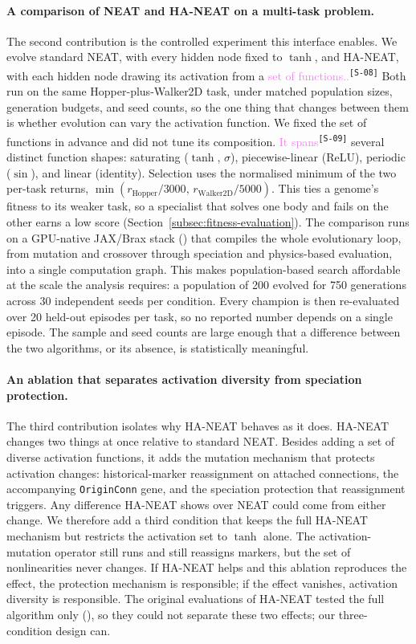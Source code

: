 \documentclass[12pt]{article}
\newcommand{\revID}[1]{\textsuperscript{\scriptsize\texttt{[#1]}}}
\newcommand{\revStyle}[2]{\textcolor{violet}{#2}\revID{#1}}   %
\begin{document}
\paragraph{A comparison of NEAT and HA-NEAT on a multi-task problem.}
The second contribution is the controlled experiment this interface enables.
We evolve standard NEAT, with every hidden node fixed to $\tanh$, and HA-NEAT, with each hidden node drawing its activation from a \revStyle{S-08}{set of functions..}
Both run on the same Hopper-plus-Walker2D task, under matched population sizes, generation budgets, and seed counts, so the one thing that changes between them is whether evolution can vary the activation function.
We fixed the set of functions in advance and did not tune its composition.
\revStyle{S-09}{It spans} several distinct function shapes: saturating ($\tanh$, $\sigma$), piecewise-linear (ReLU), periodic ($\sin$), and linear (identity).
Selection uses the normalised minimum of the two per-task returns, $\min(r_{\text{Hopper}}/3000,\, r_{\text{Walker2D}}/5000)$.
This ties a genome's fitness to its weaker task, so a specialist that solves one body and fails on the other earns a low score (Section~\ref{subsec:fitness-evaluation}).
The comparison runs on a GPU-native JAX/Brax stack (\cite{freeman_brax_2021,wang_tensorized_2024}) that compiles the whole evolutionary loop, from mutation and crossover through speciation and physics-based evaluation, into a single computation graph.
This makes population-based search affordable at the scale the analysis requires: a population of 200 evolved for 750 generations across 30 independent seeds per condition.
Every champion is then re-evaluated over 20 held-out episodes per task, so no reported number depends on a single episode.
The sample and seed counts are large enough that a difference between the two algorithms, or its absence, is statistically meaningful.

\paragraph{An ablation that separates activation diversity from speciation protection.}
The third contribution isolates why HA-NEAT behaves as it does.
HA-NEAT changes two things at once relative to standard NEAT.
Besides adding a set of diverse activation functions, it adds the mutation mechanism that protects activation changes: historical-marker reassignment on attached connections, the accompanying \texttt{OriginConn} gene, and the speciation protection that reassignment triggers.
Any difference HA-NEAT shows over NEAT could come from either change.
We therefore add a third condition that keeps the full HA-NEAT mechanism but restricts the activation set to $\tanh$ alone.
The activation-mutation operator still runs and still reassigns markers, but the set of nonlinearities never changes.
If HA-NEAT helps and this ablation reproduces the effect, the protection mechanism is responsible; if the effect vanishes, activation diversity is responsible.
The original evaluations of HA-NEAT tested the full algorithm only (\cite{hagg_evolving_2017}), so they could not separate these two effects; our three-condition design can.
\end{document}
